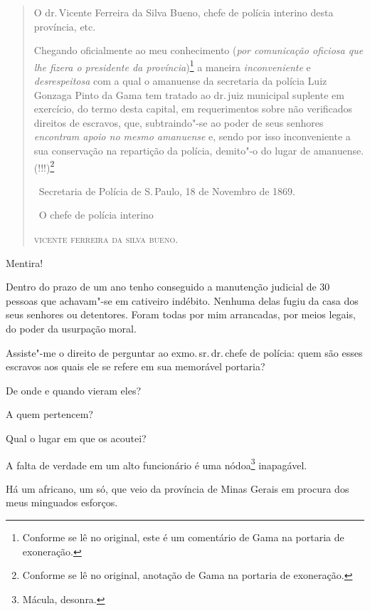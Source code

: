 \begin{quote}
O dr.\,Vicente Ferreira da Silva Bueno, chefe de polícia interino desta
província, etc.

Chegando oficialmente ao meu conhecimento (\emph{por comunicação
oficiosa que lhe fizera o presidente da província})\footnote{Conforme
  se lê no original, este é um comentário de Gama na portaria de
  exoneração.} a maneira \emph{inconveniente} e \emph{desrespeitosa} com
a qual o amanuense da secretaria da polícia Luiz Gonzaga Pinto da Gama
tem tratado ao dr.\,juiz municipal suplente em exercício, do termo desta
capital, em requerimentos sobre não verificados direitos de escravos,
que, subtraindo"-se ao poder de seus senhores \emph{encontram apoio no
mesmo amanuense} e, sendo por isso inconveniente a sua conservação na
repartição da polícia, demito"-o do lugar de amanuense. (!!!)\footnote{
  Conforme se lê no original, anotação de Gama na portaria de
  exoneração.}\medskip

\hfill\ Secretaria de Polícia de S.\,Paulo, 18 de Novembro de 1869.\smallskip

\hfill\ O chefe de polícia interino

\hfill\textsc{vicente ferreira da silva bueno.}
\end{quote}

Mentira!

Dentro do prazo de um ano tenho conseguido a manutenção judicial de 30
pessoas que achavam"-se em cativeiro indébito. Nenhuma delas fugiu da
casa dos seus senhores ou detentores. Foram todas por mim arrancadas,
por meios legais, do poder da usurpação moral.

Assiste"-me o direito de perguntar ao exmo.\,sr.\,dr.\,chefe de polícia:
quem são esses escravos aos quais ele se refere em sua memorável
portaria?

De onde e quando vieram eles?

A quem pertencem?

Qual o lugar em que os acoutei?

A falta de verdade em um alto funcionário é uma nódoa\footnote{Mácula,
  desonra.} inapagável.

Há um africano, um só, que veio da província de Minas Gerais em procura
dos meus minguados esforços.

